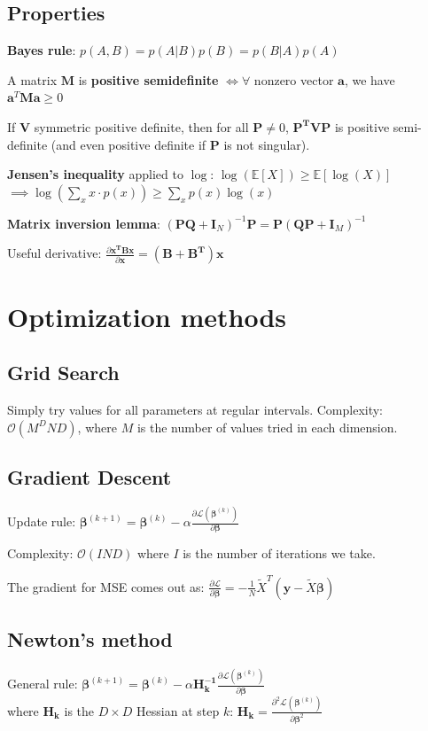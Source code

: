 \documentclass[10pt,a4paper,landscape]{article}
\renewcommand{\bf}[1]{\ensuremath{\mathbf{#1}}}
\newcommand{\bbeta}{\boldsymbol\beta}
\begin{document}
\begin{multicols*}{4}
\subsection{Properties}
\textbf{Bayes rule}: $p(A, B) = p(A|B) p(B) = p(B|A) p(A)$

A matrix $\bf{M}$ is \textbf{positive semidefinite} $\iff \forall$ nonzero vector $\bf{a}$, we have $\bf{a}^T \bf{M} \bf{a} \geq 0$

If $\bf{V}$ symmetric positive definite, then for all $\bf{P} \neq 0$, $\bf{P^T V P}$ is positive semi-definite (and even positive definite if $\bf{P}$ is not singular).

\textbf{Jensen's inequality} applied to $\log$: $\log( \mathbb{E}[X] ) \geq \mathbb{E}[\log(X)]$ \\
$\implies \log ( \sum_x x \cdot p(x) ) \geq \sum_x p(x) \log(x)$

\textbf{Matrix inversion lemma}: $(\bf{PQ} + \bf{I}_N)^{-1} \bf{P} = \bf{P}(\bf{QP} + \bf{I}_M)^{-1}$

Useful derivative: $\frac{\partial \bf{x^T B x}}{\partial \bf{x}} = (\bf{B + B^T}) \bf{x}$


\section{Optimization methods}

\subsection{Grid Search}
Simply try values for all parameters at regular intervals.
Complexity: $\mathcal{O}(M^D N D)$, where $M$ is the number of values tried in each dimension.

\subsection{Gradient Descent}
Update rule: $\bbeta^{(k+1)} = \bbeta^{(k)} - \alpha \frac{\partial \mathcal{L}(\bbeta^{(k)})}{\partial \bbeta}$

Complexity: $\mathcal{O}(I N D)$ where $I$ is the number of iterations we take.


The gradient for MSE comes out as:
$\frac{\partial \mathcal{L}}{\partial \bbeta} = - \frac{1}{N} \tilde{X}^T ( \boldsymbol y - \tilde{X} \bbeta )$

\subsection{Newton's method}
%
General rule: $\bbeta^{(k+1)} = \bbeta^{(k)} - \alpha \bf{H_k^{-1}} \frac{\partial \mathcal{L}(\bbeta^{(k)})}{\partial \bbeta}$\\
where $\bf{H_k}$ is the $D \times D$ Hessian at step $k$: $\bf{H_k} = \frac{\partial^2 \mathcal{L}(\bbeta^{(k)})}{\partial \bbeta^2}$
%


\end{multicols*}
\end{document}
